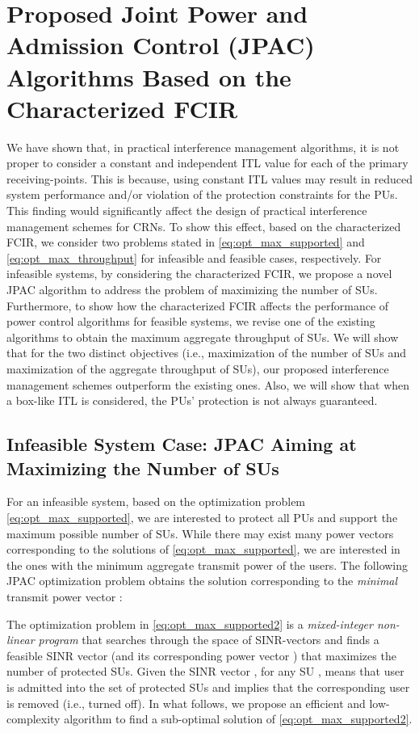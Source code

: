 \documentclass[journal,twoside]{IEEEtran}
\begin{document}
\section{Proposed Joint Power and Admission Control (JPAC) Algorithms Based on the Characterized FCIR}
	\label{sec:proposed_algorithm}

We have shown that, in practical interference management algorithms,  it is not proper to consider a constant and independent ITL value for each of the primary receiving-points. This is because, using constant ITL values may result in reduced system performance and/or violation of the protection constraints for the PUs. This finding would significantly affect
	the design of practical interference management schemes for CRNs. To show this effect, based on the characterized FCIR, we consider two problems stated in \eqref{eq:opt_max_supported} and \eqref{eq:opt_max_throughput} for infeasible and feasible cases, respectively. For infeasible systems, by considering the characterized FCIR, we propose a novel JPAC algorithm to address the problem of maximizing the number of SUs. Furthermore, to show how the characterized FCIR affects the performance of power control algorithms for feasible systems, we revise one of the existing algorithms to obtain the maximum aggregate throughput of SUs. We will show that for the two distinct objectives (i.e., maximization of the number of SUs and maximization of the aggregate throughput of SUs), our proposed interference management schemes outperform the existing ones.  Also, we will show that when a box-like ITL is considered, the PUs' protection is not always guaranteed. 
	
	
\subsection{Infeasible System Case: JPAC Aiming at Maximizing the Number of SUs}
	
	For an infeasible system, based on the optimization problem \eqref{eq:opt_max_supported}, we are interested to protect all PUs and support the maximum possible number of SUs. While there may exist many power vectors corresponding to the solutions of \eqref{eq:opt_max_supported}, we are interested in the ones with the minimum aggregate transmit power of the users. The following JPAC optimization problem obtains the solution corresponding to the \emph{minimal} transmit power vector \cite{monemi_ESRPA}:
	
		
	The optimization problem in \eqref{eq:opt_max_supported2} is a \emph{mixed-integer non-linear program} that searches through the space of SINR-vectors  and finds a feasible SINR vector  (and its corresponding power vector ) that maximizes the number of protected SUs. 
	Given the SINR vector , for any SU ,  means that user  is admitted into the set of protected SUs and  implies that the corresponding user is removed (i.e., turned off). In what follows, we propose an efficient and low-complexity algorithm to find a sub-optimal solution of \eqref{eq:opt_max_supported2}.
	
\end{document}
